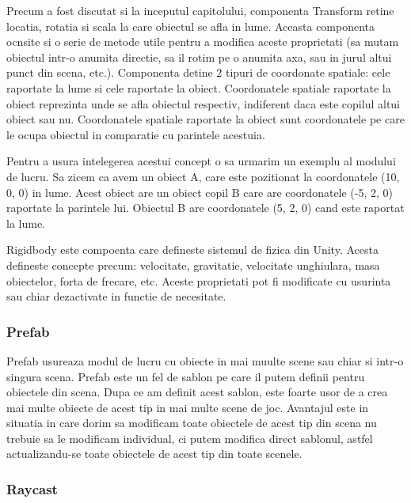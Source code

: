 \documentclass[12pt, a4paper]{article}
\begin{document}
	Precum a fost discutat si la inceputul capitolului, componenta Transform retine locatia, rotatia si scala la care obiectul se afla in lume. Aceasta componenta ocnsite si o serie de metode utile pentru a modifica aceste proprietati (sa mutam obiectul intr-o anumita directie, sa il rotim pe o anumita axa, sau in jurul altui punct din scena, etc.). Componenta detine 2 tipuri de coordonate spatiale: cele raportate la lume si cele raportate la obiect. Coordonatele spatiale raportate la obiect reprezinta unde se afla obiectul respectiv, indiferent daca este copilul altui obiect sau nu. Coordonatele spatiale raportate la obiect sunt coordonatele pe care le ocupa obiectul in comparatie cu parintele acestuia.
	\newline
	
	Pentru a usura intelegerea acestui concept o sa urmarim un exemplu al modului de lucru. Sa zicem ca avem un obiect A, care este pozitionat la coordonatele (10, 0, 0) in lume. Acest obiect are un obiect copil B care are coordonatele (-5, 2, 0) raportate la parintele lui. Obiectul B are coordonatele (5, 2, 0) cand este raportat la lume.
	\newline
	
	Rigidbody este compoenta care defineste sistemul de fizica din Unity. Acesta defineste concepte precum: velocitate, gravitatie, velocitate unghiulara, masa obiectelor, forta de frecare, etc. Aceste proprietati pot fi modificate cu usurinta sau chiar dezactivate in functie de necesitate.
	
	
	
	
	
	\subsubsection{Prefab}
	
	Prefab usureaza modul de lucru cu obiecte in mai muulte scene sau chiar si intr-o singura scena. Prefab este un fel de sablon pe care il putem definii pentru obiectele din scena. Dupa ce am definit acest sablon, este foarte usor de a crea mai multe obiecte de acest tip in mai multe scene de joc. Avantajul este in situatia in care dorim sa modificam toate obiectele de acest tip din scena nu trebuie sa le modificam individual, ci putem modifica direct sablonul, astfel actualizandu-se toate obiectele de acest tip din toate scenele.
	
	
	
	
	
	\subsubsection{Raycast}
	
\end{document}
